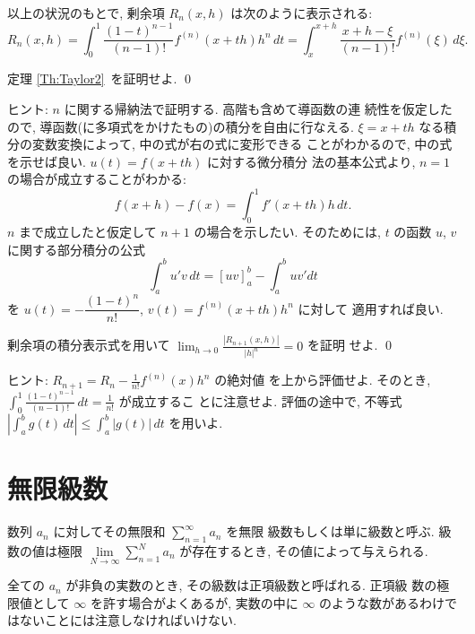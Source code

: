 \documentclass[12pt,twoside]{jarticle}
\begin{document}
\begin{Theorem}[剰余項の積分表示]\label{Th:Taylor2}
  以上の状況のもとで, 剰余項 $R_n(x,h)$ は次のように表示される:
  \[
    R_n(x,h)
    = \int_0^1 \frac{(1-t)^{n-1}}{(n-1)!} f^{(n)}(x+th)h^n \,dt
    = \int_x^{x+h} \frac{x+h-\xi}{(n-1)!} f^{(n)}(\xi) \,d\xi.
  \]
\end{Theorem}

\begin{question}
  定理 \ref{Th:Taylor2}\ を証明せよ. \qed
\end{question}

\noindent ヒント: $n$ に関する帰納法で証明する. 高階も含めて導函数の連
続性を仮定したので, 導函数(に多項式をかけたもの)の積分を自由に行なえる. %
$\xi = x + th$ なる積分の変数変換によって, 中の式が右の式に変形できる
ことがわかるので, 中の式を示せば良い. $u(t)=f(x+th)$ に対する微分積分
法の基本公式より, $n=1$ の場合が成立することがわかる:
\[
  f(x+h) - f(x) = \int_0^1 f'(x + th) h \,dt.
\]%
$n$ まで成立したと仮定して $n+1$ の場合を示したい. そのためには, $t$ %
の函数 $u$, $v$ に関する部分積分の公式
\[
    \int_a^b u' v \,dt
  = \left[ u v \right]_a^b - \int_a^b u v' dt
\]%
を $u(t) = - \dfrac{(1-t)^n}{n!}$, $v(t) = f^{(n)}(x+th)h^n$ に対して
適用すれば良い.

\begin{question}
  剰余項の積分表示式を用いて %
  $\displaystyle \lim_{h\to0}\frac{|R_{n+1}(x,h)|}{|h|^n} = 0$ を証明
  せよ.  \qed
\end{question}

\noindent ヒント: $R_{n+1} = R_n - \frac{1}{n!}f^{(n)}(x)h^n$ の絶対値
を上から評価せよ. そのとき, %
$\int_0^1 \frac{(1-t)^{n-1}}{(n-1)!} \,dt = \frac{1}{n!}$ が成立するこ
とに注意せよ. 評価の途中で, 
不等式 $|\int_a^b g(t)\,dt| \le \int_a^b|g(t)|\,dt$ を用いよ. %


\section{無限級数}

数列 $a_n$ に対してその無限和 $\sum\limits_{n=1}^\infty a_n$ を無限
級数もしくは単に級数と呼ぶ. 級数の値は極限 %
$\lim\limits_{N\to\infty}\sum\limits_{n=1}^N a_n$ が存在するとき, 
その値によって与えられる. 

全ての $a_n$ が非負の実数のとき, その級数は正項級数と呼ばれる. 正項級
数の極限値として $\infty$ を許す場合がよくあるが, 実数の中に $\infty$ 
のような数があるわけではないことには注意しなければいけない.
\end{document}
